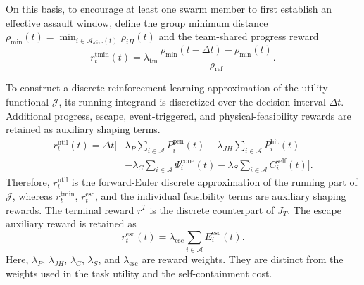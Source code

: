 \documentclass{cja}
\begin{document}
On this basis, to encourage at least one swarm member to first establish an effective assault window, define the group minimum distance $\rho_{\min}(t)=\min_{i\in\mathcal{A}_{\mathrm{alive}}(t)}\rho_{iH}(t)$ and the team-shared progress reward
\begin{equation}
r_t^{\mathrm{tmin}}(t)=\lambda_{\mathrm{tm}}\,\frac{\rho_{\min}(t-\Delta t)-\rho_{\min}(t)}{\rho_{\mathrm{ref}}}.
\label{eq:r-team}
\end{equation}

To construct a discrete reinforcement-learning approximation of the utility functional $\mathcal J$, its running integrand is discretized over the decision interval $\Delta t$. Additional progress, escape, event-triggered, and physical-feasibility rewards are retained as auxiliary shaping terms.
\begin{equation}
\begin{aligned}
r_t^{\mathrm{util}}(t)
=
\Delta t
\Biggl[
&
\lambda_P
\sum_{i\in\mathcal A}
P_i^{\mathrm{pen}}(t)
+
\lambda_{JH}
\sum_{i\in\mathcal A}
P_i^{\mathrm{hit}}(t)
\\
&-
\lambda_C
\sum_{i\in\mathcal A}
\Psi_i^{\mathrm{cone}}(t)
-
\lambda_S
\sum_{i\in\mathcal A}
C_i^{\mathrm{self}}(t)
\Biggr].
\end{aligned}
\label{eq:r-prior}
\end{equation}
Therefore, $r_t^{\mathrm{util}}$ is the forward-Euler discrete approximation of the running part of $\mathcal J$, whereas $r_t^{\mathrm{tmin}}$, $r_t^{\mathrm{esc}}$, and the individual feasibility terms are auxiliary shaping rewards. The terminal reward $r^T$ is the discrete counterpart of $J_T$.
The escape auxiliary reward is retained as
\begin{equation}
r_t^{\mathrm{esc}}(t)=\lambda_{\mathrm{esc}}\sum_{i\in\mathcal{A}}E_i^{\mathrm{esc}}(t).
\end{equation}
Here, $\lambda_P$, $\lambda_{JH}$, $\lambda_C$, $\lambda_S$, and $\lambda_{\mathrm{esc}}$ are reward weights. They are distinct from the weights used in the task utility and the self-containment cost.
\end{document}
